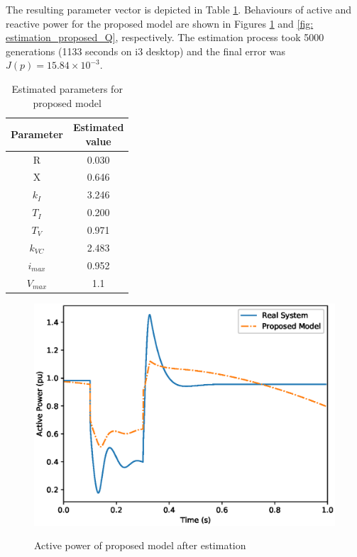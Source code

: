 The resulting parameter vector is depicted in Table \ref{tab: results_proposed}. Behaviours of active and reactive power for the proposed model are shown in Figures \ref{fig: estimation_proposed_P} and \ref{fig: estimation_proposed_Q}, respectively. The estimation process took 5000 generations (1133 seconds on i3 desktop) and the final error was $J(p) = 15.84\times 10^{-3}$.

\begin{table}[h]
	\centering
	\caption{Estimated parameters for proposed model}
	\begin{tabular}{c|c}
		Parameter & \shortstack{Estimated \\ value} \\\hline
		R & 0.030 \\
		X & 0.646 \\
		$k_{I}$ & 3.246 \\
		$T_{I}$ & 0.200 \\
		$T_{V}$ & 0.971 \\
		$k_{VC}$ & 2.483 \\
		$i_{max}$ & 0.952 \\
		$V_{max}$ & 1.1
	\end{tabular}
	\label{tab: results_proposed}
\end{table}

\begin{figure}[!h]
	\centering
	\caption{Active power of proposed model after estimation}
	\includegraphics[scale=.7]{Images/P_proposed_estimated.eps}
	\label{fig: estimation_proposed_P}
\end{figure}

